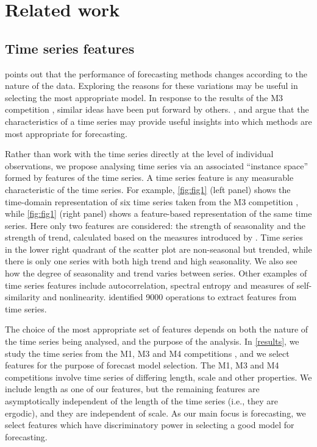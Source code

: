 \documentclass[11pt,a4paper,]{article}
\begin{document}
\hypertarget{litreview}{%
\section{Related work}\label{litreview}}

\hypertarget{time-series-features}{%
\subsection{Time series features}\label{time-series-features}}

\textcite{reid1972comparison} points out that the performance of forecasting methods changes according to the nature of the data. Exploring the reasons for these variations may be useful in selecting the most appropriate model. In response to the results of the M3 competition \autocite{makridakis2000m3}, similar ideas have been put forward by others. \textcite{hyndman2001s}, \textcite{lawrence2001s} and \textcite{armstrong2001s} argue that the characteristics of a time series may provide useful insights into which methods are most appropriate for forecasting.

Rather than work with the time series directly at the level of individual observations, we propose analysing time series via an associated ``instance space'' formed by features of the time series. A time series feature is any measurable characteristic of the time series. For example, \autoref{fig:fig1} (left panel) shows the time-domain representation of six time series taken from the M3 competition \autocite{makridakis2000m3}, while \autoref{fig:fig1} (right panel) shows a feature-based representation of the same time series. Here only two features are considered: the strength of seasonality and the strength of trend, calculated based on the measures introduced by \textcite{wang2009rule}. Time series in the lower right quadrant of the scatter plot are non-seasonal but trended, while there is only one series with both high trend and high seasonality. We also see how the degree of seasonality and trend varies between series. Other examples of time series features include autocorrelation, spectral entropy and measures of self-similarity and nonlinearity. \textcite{fulcher2014highly} identified 9000 operations to extract features from time series.

The choice of the most appropriate set of features depends on both the nature of the time series being analysed, and the purpose of the analysis. In \autoref{results}, we study the time series from the M1, M3 and M4 competitions \autocite{makridakis1982accuracy,makridakis2000m3,makridakis2019m4}, and we select features for the purpose of forecast model selection. The M1, M3 and M4 competitions involve time series of differing length, scale and other properties. We include length as one of our features, but the remaining features are asymptotically independent of the length of the time series (i.e., they are ergodic), and they are independent of scale. As our main focus is forecasting, we select features which have discriminatory power in selecting a good model for forecasting.
\end{document}
